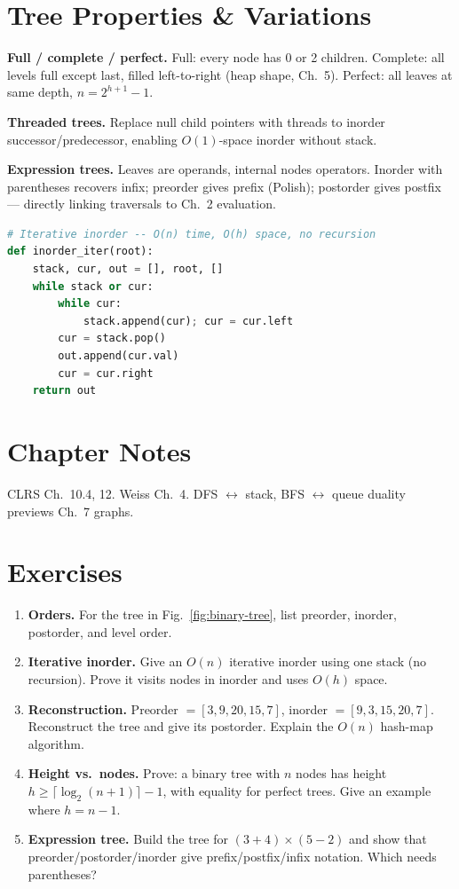 
\section{Tree Properties \& Variations}
\label{sec:tree-properties}
\textbf{Full / complete / perfect.} Full: every node has 0 or 2 children. Complete: all levels full except last, filled left-to-right (heap shape, Ch.~5). Perfect: all leaves at same depth, $n=2^{h+1}-1$.

\textbf{Threaded trees.} Replace null child pointers with threads to inorder successor/predecessor, enabling $O(1)$-space inorder without stack.

\textbf{Expression trees.} Leaves are operands, internal nodes operators. Inorder with parentheses recovers infix; preorder gives prefix (Polish); postorder gives postfix --- directly linking traversals to Ch.~2 evaluation.

\begin{lstlisting}[language=Python]
# Iterative inorder -- O(n) time, O(h) space, no recursion
def inorder_iter(root):
    stack, cur, out = [], root, []
    while stack or cur:
        while cur:
            stack.append(cur); cur = cur.left
        cur = stack.pop()
        out.append(cur.val)
        cur = cur.right
    return out
\end{lstlisting}

\section{Chapter Notes}
CLRS Ch.~10.4, 12. Weiss Ch.~4. DFS $\leftrightarrow$ stack, BFS $\leftrightarrow$ queue duality previews Ch.~7 graphs.

\section{Exercises}
\label{sec:ch03-exercises}
\begin{enumerate}[label=E3.\arabic*, leftmargin=*, itemsep=0.7em]
    \item \textbf{Orders.} For the tree in Fig.~\ref{fig:binary-tree}, list preorder, inorder, postorder, and level order.
    \item \textbf{Iterative inorder.} Give an $O(n)$ iterative inorder using one stack (no recursion). Prove it visits nodes in inorder and uses $O(h)$ space.
    \item \textbf{Reconstruction.} Preorder $=[3,9,20,15,7]$, inorder $=[9,3,15,20,7]$. Reconstruct the tree and give its postorder. Explain the $O(n)$ hash-map algorithm.
    \item \textbf{Height vs.\ nodes.} Prove: a binary tree with $n$ nodes has height $h\ge\lceil\log_{2}(n+1)\rceil-1$, with equality for perfect trees. Give an example where $h=n-1$.
    \item \textbf{Expression tree.} Build the tree for $(3+4)\times(5-2)$ and show that preorder/postorder/inorder give prefix/postfix/infix notation. Which needs parentheses?
\end{enumerate}
